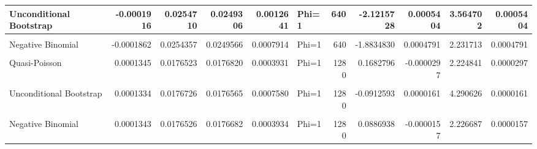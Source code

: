 \documentclass[border=1mm]{standalone}
\begin{document}
\begin{table}
\begin{tabular}{l|r|r|r|r|l|r|r|r|r|r}
\hline
Unconditional Bootstrap & -0.0001916 & 0.0254710 & 0.0249306 & 0.0012641 & Phi=1 & 640 & -2.1215728 & 0.0005404 & 3.564702 & 0.0005404\\
\hline
\cellcolor{gray!10}{Conditional Bootstrap} & \cellcolor{gray!10}{-0.0001926} & \cellcolor{gray!10}{0.0254650} & \cellcolor{gray!10}{0.0249306} & \cellcolor{gray!10}{0.0012641} & \cellcolor{gray!10}{Phi=1} & \cellcolor{gray!10}{640} & \cellcolor{gray!10}{-2.0987222} & \cellcolor{gray!10}{0.0005344} & \cellcolor{gray!10}{3.564702} & \cellcolor{gray!10}{0.0005344}\\
\hline
Negative Binomial & -0.0001862 & 0.0254357 & 0.0249566 & 0.0007914 & Phi=1 & 640 & -1.8834830 & 0.0004791 & 2.231713 & 0.0004791\\
\hline
\cellcolor{gray!10}{Poisson} & \cellcolor{gray!10}{0.0001345} & \cellcolor{gray!10}{0.0176523} & \cellcolor{gray!10}{0.0176835} & \cellcolor{gray!10}{0.0001767} & \cellcolor{gray!10}{Phi=1} & \cellcolor{gray!10}{1280} & \cellcolor{gray!10}{0.1767877} & \cellcolor{gray!10}{-0.0000312} & \cellcolor{gray!10}{1.000000} & \cellcolor{gray!10}{0.0000312}\\
\hline
Quasi-Poisson & 0.0001345 & 0.0176523 & 0.0176820 & 0.0003931 & Phi=1 & 1280 & 0.1682796 & -0.0000297 & 2.224841 & 0.0000297\\
\hline
\cellcolor{gray!10}{Sandwich} & \cellcolor{gray!10}{0.0001345} & \cellcolor{gray!10}{0.0176523} & \cellcolor{gray!10}{0.0176559} & \cellcolor{gray!10}{0.0005042} & \cellcolor{gray!10}{Phi=1} & \cellcolor{gray!10}{1280} & \cellcolor{gray!10}{0.0203103} & \cellcolor{gray!10}{-0.0000036} & \cellcolor{gray!10}{2.853925} & \cellcolor{gray!10}{0.0000036}\\
\hline
Unconditional Bootstrap & 0.0001334 & 0.0176726 & 0.0176565 & 0.0007580 & Phi=1 & 1280 & -0.0912593 & 0.0000161 & 4.290626 & 0.0000161\\
\hline
\cellcolor{gray!10}{Conditional Bootstrap} & \cellcolor{gray!10}{0.0001448} & \cellcolor{gray!10}{0.0176747} & \cellcolor{gray!10}{0.0176565} & \cellcolor{gray!10}{0.0007580} & \cellcolor{gray!10}{Phi=1} & \cellcolor{gray!10}{1280} & \cellcolor{gray!10}{-0.1030485} & \cellcolor{gray!10}{0.0000182} & \cellcolor{gray!10}{4.290626} & \cellcolor{gray!10}{0.0000182}\\
\hline
Negative Binomial & 0.0001343 & 0.0176526 & 0.0176682 & 0.0003934 & Phi=1 & 1280 & 0.0886938 & -0.0000157 & 2.226687 & 0.0000157\\
\hline
\end{tabular}
\end{table}
\end{document}
